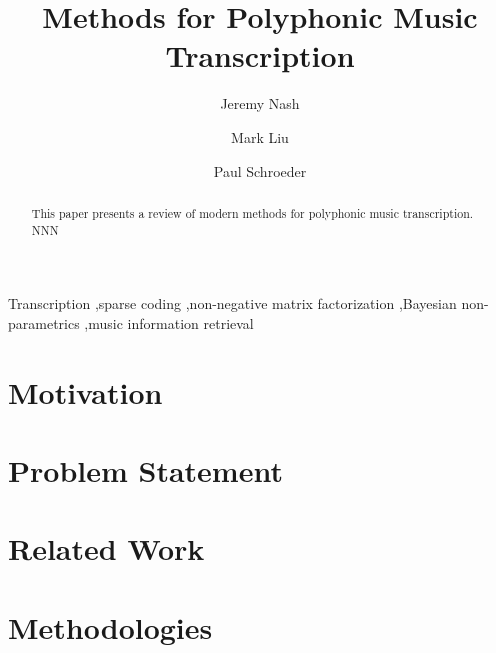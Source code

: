 \documentclass[5p]{elsarticle}
\begin{document}
\begin{frontmatter}

%
\title{Methods for Polyphonic Music Transcription} %
\author[add]{Jeremy Nash}
\author[add]{Mark Liu}
\author[add]{Paul Schroeder}
\address[add]{Electrical Engineering Department, University of Michigan, Ann Arbor, MI 48109}

%
\begin{abstract}
This paper presents a review of modern methods for polyphonic music transcription. NNN
\end{abstract}
\begin{keyword}
Transcription \sep sparse coding \sep non-negative matrix factorization \sep Bayesian non-parametrics \sep music information retrieval
\end{keyword}

\end{frontmatter}

\setcounter{topnumber}{1}

\section{Motivation}







\section{Problem Statement}


\section{Related Work}

\section{Methodologies}
\end{document}
